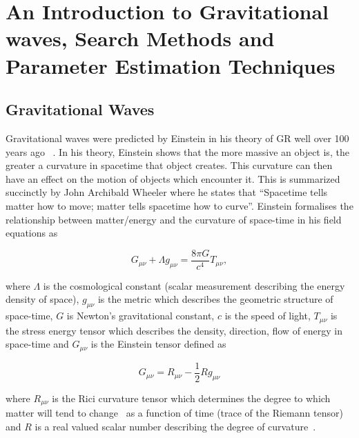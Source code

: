 \chapter[Introduction to Gravitational waves]{An Introduction to Gravitational waves, Search Methods and Parameter Estimation Techniques}

\section{Gravitational Waves}

Gravitational waves were predicted by Einstein in his theory of \ac{GR} well over 100 years ago \cite{GR_Einstein_paper}~. In his theory, Einstein shows that the more massive an object is, the greater a curvature in spacetime that object creates. This curvature can then have an effect on the motion of objects which encounter it. This is summarized succinctly by John Archibald Wheeler where he states that ``Spacetime tells matter how to move; matter tells spacetime how to curve''. Einstein formalises the relationship between matter/energy and the curvature of space-time in his field equations as~

\begin{equation}\label{eqn:FieldEquations}
    G_{\mu \nu} + \Lambda g_{\mu \nu} = \frac{8 \pi G}{c^{4}} T_{\mu \nu},
\end{equation}{}

where $\Lambda$ is the cosmological constant (scalar measurement describing the energy density of space), $g_{\mu \nu}$ is the metric which describes the geometric structure of space-time, $G$ is Newton's gravitational constant, $c$ is the speed of light, $T_{\mu \nu}$ is the stress energy tensor which describes the density, direction,  flow of energy in space-time\chris{,} and $G_{\mu \nu}$ is the Einstein tensor defined as

\begin{equation}
    G_{\mu \nu} = R_{\mu \nu} - \frac{1}{2} R g_{\mu \nu}
\end{equation}

where $R_{\mu \nu}$ is the Rici curvature tensor which determines the degree to which matter will tend to change~ as a function of time (trace of the Riemann tensor) and $R$ is a real valued scalar number describing the degree of curvature~. 

